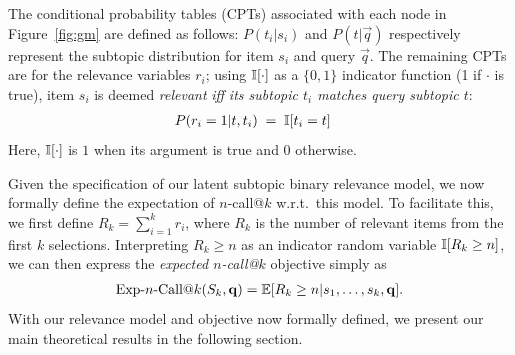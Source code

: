 The conditional probability tables (CPTs) associated with each node in
Figure~\ref{fig:gm} are defined as follows: $P(t_i|s_i)$ and
$P(t|\vec{q})$ respectively represent the subtopic distribution for
item $s_i$ and query $\vec{q}$.  
The remaining CPTs are for
the relevance variables $r_i$; using $\mathbb{I}[\cdot]$ as a $\{0,1\}$
indicator function (1 if $\cdot$ is true), item $s_i$ is deemed
\emph{relevant} \emph{iff} \emph{its subtopic $t_i$ matches query
  subtopic $t$}:
\begin{align*}
P(r_{i}=1|t, t_{i}) & \; = \; \mathbb{I}[t_{i} = t]
\end{align*}
Here, $\mathbb{I}[\cdot]$ is $1$ when its argument is true and $0$ otherwise.


Given the specification of our latent subtopic binary relevance model,
we now formally define the expectation of $n$-call@$k$ w.r.t.\ this
model.  To facilitate this, we first define $R_k = \sum_{i=1}^k r_i$,
where $R_k$ is the number of relevant items from the first $k$
selections.  Interpreting $R_k \geq n$ as an indicator random variable
$\mathbb{I}[R_k \geq n]$, we can then express the \emph{expected $n$-call@$k$}
objective simply as
\begin{align}
\label{eq:setRelevance}
  \ExpNCall{n}(S_k,\vec{q})
  = \mathbb{E}[R_k\geq n|s_1,\dots,s_k,\vec{q}] .  
\end{align}
With our relevance model and objective now formally defined, 
we present our main theoretical results in the following section.
